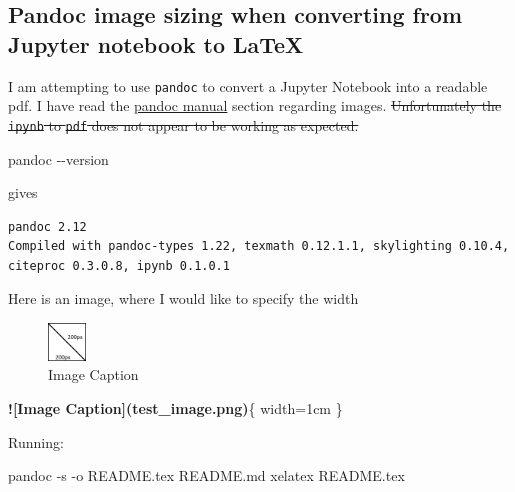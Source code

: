 \documentclass[
]{article}
\author{}
\date{}
\newenvironment{Shaded}{}{}
\newcommand{\AlertTok}[1]{\textcolor[rgb]{1.00,0.00,0.00}{\textbf{#1}}}
\newcommand{\AttributeTok}[1]{\textcolor[rgb]{0.49,0.56,0.16}{#1}}
\newcommand{\ExtensionTok}[1]{#1}
\newcommand{\NormalTok}[1]{#1}
\begin{document}
\hypertarget{pandoc-image-sizing-when-converting-from-jupyter-notebook-to-latex}{%
\subsection{Pandoc image sizing when converting from Jupyter notebook to
LaTeX}\label{pandoc-image-sizing-when-converting-from-jupyter-notebook-to-latex}}

I am attempting to use \texttt{pandoc} to convert a Jupyter Notebook
into a readable pdf. I have read the
\href{https://pandoc.org/MANUAL.html\#images}{pandoc manual} section
regarding images. \sout{Unfortunately the \mbox{\texttt{ipynb}} to
\mbox{\texttt{pdf}} does not appear to be working as expected.}

\begin{Shaded}
\begin{Highlighting}[]
\ExtensionTok{pandoc} \AttributeTok{{-}{-}version}
\end{Highlighting}
\end{Shaded}

gives

\begin{verbatim}
pandoc 2.12
Compiled with pandoc-types 1.22, texmath 0.12.1.1, skylighting 0.10.4,
citeproc 0.3.0.8, ipynb 0.1.0.1
\end{verbatim}

Here is an image, where I would like to specify the width

\begin{figure}
\centering
\includegraphics[width=1cm,height=\textheight]{test_image.png}
\caption{Image Caption}
\end{figure}

\begin{Shaded}
\begin{Highlighting}[]
\AlertTok{![Image Caption](test\_image.png)}\NormalTok{\{ width=1cm \}}
\end{Highlighting}
\end{Shaded}

Running:

\begin{Shaded}
\begin{Highlighting}[]
\ExtensionTok{pandoc} \AttributeTok{{-}s} \AttributeTok{{-}o}\NormalTok{ README.tex README.md}
\ExtensionTok{xelatex}\NormalTok{ README.tex}
\end{Highlighting}
\end{Shaded}
\end{document}
